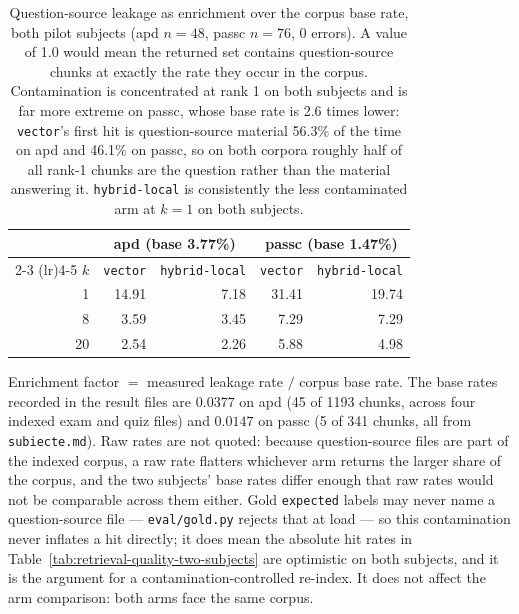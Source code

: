 \begin{table}[htbp]
  \centering
  \caption{Question-source leakage as enrichment over the corpus base rate, both pilot subjects
    (apd $n=48$, passc $n=76$, 0 errors). A value of 1.0 would mean the returned set contains
    question-source chunks at exactly the rate they occur in the corpus. Contamination is
    concentrated at rank 1 on both subjects and is far more extreme on passc, whose base rate is
    2.6 times lower: \texttt{vector}'s first hit is question-source material 56.3\% of the time on
    apd and 46.1\% on passc, so on both corpora roughly half of all rank-1 chunks are the question
    rather than the material answering it. \texttt{hybrid-local} is consistently the less
    contaminated arm at $k=1$ on both subjects.}
  \label{tab:retrieval-leakage-two-subjects}
  \begin{tabular}{rrrrr}
    \toprule
    & \multicolumn{2}{c}{apd (base 3.77\%)} & \multicolumn{2}{c}{passc (base 1.47\%)} \\
    \cmidrule(lr){2-3} \cmidrule(lr){4-5}
    $k$ & \texttt{vector} & \texttt{hybrid-local} & \texttt{vector} & \texttt{hybrid-local} \\
    \midrule
     1 & 14.91 &  7.18 & 31.41 & 19.74 \\
     8 &  3.59 &  3.45 &  7.29 &  7.29 \\
    20 &  2.54 &  2.26 &  5.88 &  4.98 \\
    \bottomrule
  \end{tabular}

  \vspace{0.5em}
  \footnotesize
  Enrichment factor $=$ measured leakage rate $/$ corpus base rate. The base rates recorded in the
  result files are $0.0377$ on apd (45 of 1193 chunks, across four indexed exam and quiz files) and
  $0.0147$ on passc (5 of 341 chunks, all from \texttt{subiecte.md}). Raw rates are not quoted:
  because question-source files are part of the indexed corpus, a raw rate flatters whichever arm
  returns the larger share of the corpus, and the two subjects' base rates differ enough that raw
  rates would not be comparable across them either. Gold \texttt{expected} labels may never name a
  question-source file --- \texttt{eval/gold.py} rejects that at load --- so this contamination
  never inflates a hit directly; it does mean the absolute hit rates in
  Table~\ref{tab:retrieval-quality-two-subjects} are optimistic on both subjects, and it is the
  argument for a contamination-controlled re-index. It does not affect the arm comparison: both
  arms face the same corpus.
\end{table}
